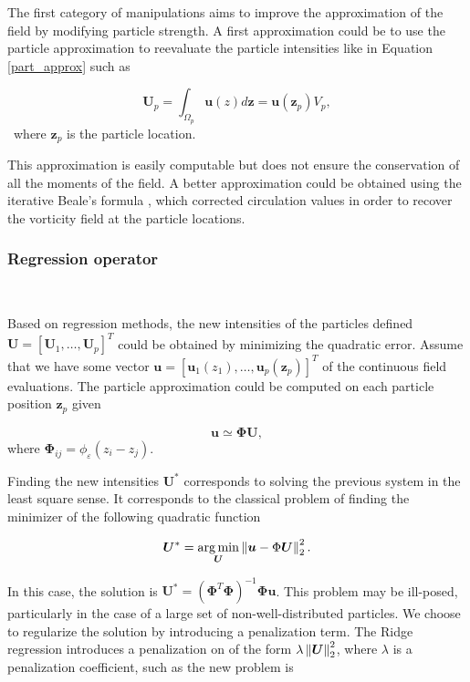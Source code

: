 The first category of manipulations aims to improve the approximation of the field by modifying particle strength.
A first approximation could be to use the particle approximation to reevaluate the particle intensities like in Equation \ref{part_approx} such as

\begin{equation*}
	\bm U_p = \int_{\Omega_p} \bm u(z) d\bm z = \bm u(\bm z_p) V_p,
\end{equation*}~where $\bm z_p$ is the particle location.

This approximation is easily computable but does not ensure the conservation of all the moments of the field. A better approximation could be obtained using the iterative Beale's formula \cite{beale_accuracy_1988}, which corrected circulation values in order to recover the vorticity field at the particle locations.

\subsubsection{Regression operator}~\label{regressionOperator}

Based on regression methods, the new intensities of the particles defined $\bm{U} = [\bm U_1, \dots, \bm U_p]^T$ could be obtained by minimizing the quadratic error. Assume that we have some vector $\bm{u} = [\bm u_1(z_1), \dots, \bm u_p(\bm z_p)]^T$ of the continuous field evaluations. The particle approximation could be computed on each particle position $\bm z_p$ given

\begin{equation*}
	\bm{u} \simeq \bm \Phi \bm{U},
\end{equation*}where $\bm \Phi_{ij} = \phi_\varepsilon(z_i - z_j)$.

Finding the new intensities $\bm U^*$ corresponds to solving the previous system in the least square sense. It corresponds to the classical problem of finding the minimizer of the following quadratic function

\begin{equation*}
	\bm{U}^*= \operatorname*{arg\,min}_{\bm{U}} \left\lVert \bm{u} - \Phi \bm{U} \right\rVert^2_2.
\end{equation*}


In this case, the solution is $\bm U^*  = (\bm \Phi^T \bm \Phi)^{-1} \bm \Phi \bm{u}$. This problem may be ill-posed, particularly in the case of a large set of non-well-distributed particles. We choose to regularize the solution by introducing a penalization term. The Ridge regression introduces a penalization on of the form $\lambda \left\lVert \bm U \right\rVert_2^2$, where $\lambda$ is a penalization coefficient, such as the new problem is

